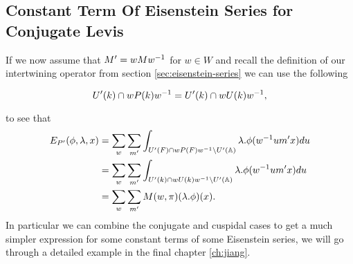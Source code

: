     \subsection{Constant Term Of Eisenstein Series for Conjugate Levis}\label{constant_conjugate_levi}
    If we now assume that \(M' = wMw^{-1}\) for \(w\in W\) and recall the definition of our intertwining operator from section \ref{sec:eisenstein-series} we can use the following 
    \begin{Lemma}
        \[U'(k) \cap wP(k) w^{-1} = U'(k) \cap wU(k)w^{-1},\]
    \end{Lemma}
    to see that 
    \begin{equation*}
        \begin{aligned}
             E_{P'}( \phi, \lambda, x) &= \sum_{ w} \sum_{m'} \int_{U'(F)\cap wP(F)w\inv \setminus U'(\A)} \lambda.\phi( w\inv um' x)  du \\
             &=  \sum_{ w} \sum_{m'} \int_{U'(k) \cap wU(k)w\inv \setminus U'(\A)} \lambda.\phi( w\inv um' x)  du \\
             &= \sum_{ w} \sum_{m'} M(w, \pi)(\lambda.\phi)(x).
        \end{aligned}
    \end{equation*}
    In particular we can combine the conjugate and cuspidal cases to get a much simpler expression for some constant terms of some Eisenstein series, we will go through a detailed example in the final chapter \ref{ch:jiang}.
    


    